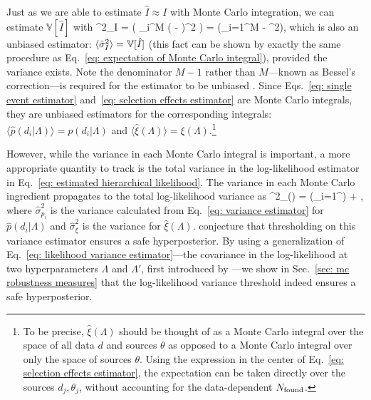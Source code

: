 Just as we are able to estimate $\hat{I} \approx I$ with Monte Carlo integration, we can estimate $\mathbb{V}[\hat{I}]$ with
\beq
\hat{\sigma}^2_{I} =  \left(  \sum\limits_i^M \left( -  \right)^2 \right) = \left(\sum_{i=1}^M - ^2\right),
\label{eq: variance estimator}
\eeq
which is also an unbiased estimator: $\langle \hat{\sigma}^2_I\rangle = \mathbb{V}[\hat{I}]$ (this fact can be shown by exactly the same procedure as Eq.~\ref{eq: expectation of Monte Carlo integral}), provided the variance exists. Note the denominator $M-1$ rather than $M$---known as Bessel's correction---is required for the estimator to be unbiased \citep{kendall1977advanced}.
Since Eqs.~\ref{eq: single event estimator} and~\ref{eq: selection effects estimator} are Monte Carlo integrals, they are unbiased estimators for the corresponding integrals: $\langle\hat{p}(d_i|\Lambda)\rangle = p(d_i|\Lambda)$ and $\langle\hat{\xi}(\Lambda)\rangle = \xi(\Lambda)$.\footnote{To be precise, $\hat{\xi}(\Lambda)$ should be thought of as a Monte Carlo integral over the space of all data $d$ and sources $\theta$ as opposed to a Monte Carlo integral over only the space of sources $\theta$. Using the expression in the center of Eq.~\ref{eq: selection effects estimator}, the expectation can be taken directly over the sources $d_j, \theta_j$, without accounting for the data-dependent $N_{\rm found}$.}


However, while the variance in each Monte Carlo integral is important, a more appropriate quantity to track is the total variance in the log-likelihood estimator in Eq.~\ref{eq: estimated hierarchical likelihood}. The variance in each Monte Carlo ingredient propagates to the total log-likelihood variance as
\beq
\hat{\sigma}^2_{\ln{}}(\Lambda) = \left(\sum_{i=1}^{\Nobs}\right) + ,
\label{eq: likelihood variance estimator}
\eeq
where $\hat{\sigma}^2_{p_i}$ is the variance calculated from Eq.~\ref{eq: variance estimator} for $\hat{p}(d_i|\Lambda)$ and $\hat{\sigma}^2_{\xi}$ is the variance for $\hat{\xi}(\Lambda)$.
\citet{Talbot:2023pex} conjecture that thresholding on this variance estimator ensures a safe hyperposterior. By using a generalization of Eq.~\ref{eq: likelihood variance estimator}---the covariance in the log-likelihood at two hyperparameters $\Lambda$ and $\Lambda'$, first introduced by \citet{Essick:2022ojx}---we show in Sec.~\ref{sec: mc robustness measures} that the log-likelihood variance threshold indeed ensures a safe hyperposterior.

